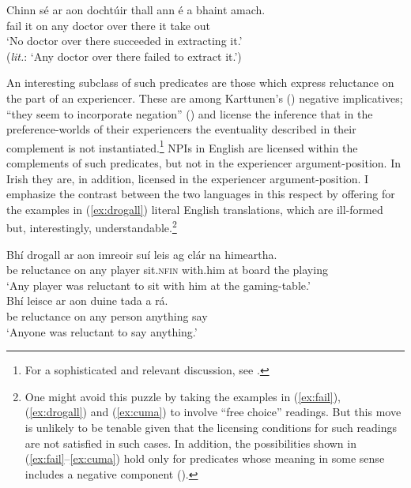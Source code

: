 \documentclass[output=paper,colorlinks,citecolor=brown]{langscibook}
\begin{document}
\ea\label{ex:fail}
\gll Chinn sé ar aon dochtúir thall ann é a bhaint amach. \\
     {fail\past} it on any doctor over there it {\vce} {take\vn} out \\
\glt `No doctor over there succeeded in extracting it.' \\
     ({\itshape lit.}: `Any doctor over there failed to extract it.')
\z


An interesting subclass of such predicates are those which express reluctance on the part of an experiencer. These are among Karttunen's (\citeyear{lauri:71}) negative implicatives; “they seem to incorporate negation” (\cite[352]{lauri:71}) and license the inference that in the preference\hyp worlds of their experiencers the eventuality described in their complement is not instantiated.\footnote{For a sophisticated and relevant discussion, see \citet[115--121]{von-fintel:99}.} NPIs in English are licensed within the complements of such predicates, but not in the experiencer argument\hyp position. In Irish they are, in addition, licensed in the experiencer argument-position.  I emphasize the contrast between the two languages in this respect by offering for the examples in (\ref{ex:drogall}) literal English translations, which are ill-formed but, interestingly, understandable.\footnote{One might avoid this puzzle by taking the examples in (\ref{ex:fail}), (\ref{ex:drogall}) and (\ref{ex:cuma}) to involve “free choice” readings. But this move is unlikely to be tenable given that the licensing conditions for such readings are not satisfied in such cases. In addition, the possibilities shown in (\ref{ex:fail}--\ref{ex:cuma}) hold only for   predicates whose meaning in some sense includes a negative component (\citealt{klima:64, lauri:71, kadmon-landman:93, von-fintel:99}).}

\ea\label{ex:drogall}
\ea
\gll Bhí drogall ar aon imreoir suí leis ag clár na himeartha. \\
     {be\past} reluctance on any player {sit.\textsc{nfin}} with.him at board {the\gen} {playing\gen} \\
\glt `Any player was reluctant to sit with him at the gaming-table.'\\ \hfill{}
\ex
\gll Bhí leisce ar aon duine tada a rá. \\
     {be\past} reluctance on any person anything {\vce} {say\vn} \\
\glt `Anyone was reluctant to say anything.'
\z
\z
\end{document}
